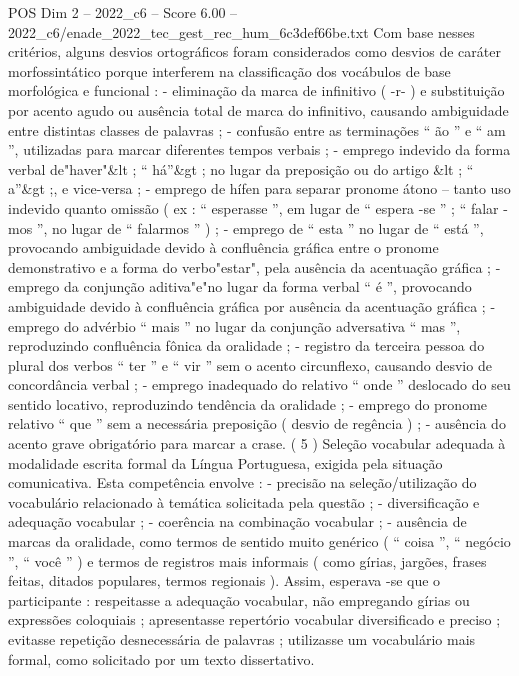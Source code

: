 \begin{textsample}{POS Dim 2 – 2022\_c6 – Score 6.00 – 2022\_c6/enade\_2022\_tec\_gest\_rec\_hum\_6c3def66be.txt}
Com base nesses critérios, alguns desvios ortográficos foram considerados como desvios de caráter morfossintático porque interferem na classificação dos vocábulos de base morfológica e funcional : - eliminação da marca de infinitivo ( -r- ) e substituição por acento agudo ou ausência total de marca do infinitivo, causando ambiguidade entre distintas classes de palavras ; - confusão entre as terminações “ ão ” e “ am ”, utilizadas para marcar diferentes tempos verbais ; - emprego indevido da forma verbal de"haver"\&lt ; “ há”\&gt ; no lugar da preposição ou do artigo \&lt ; “ a”\&gt ;, e vice-versa ; - emprego de hífen para separar pronome átono – tanto uso indevido quanto omissão ( ex : “ esperasse ”, em lugar de “ espera -se ” ; “ falar -mos ”, no lugar de “ falarmos ” ) ; - emprego de “ esta ” no lugar de “ está ”, provocando ambiguidade devido à confluência gráfica entre o pronome demonstrativo e a forma do verbo"estar", pela ausência da acentuação gráfica ; - emprego da conjunção aditiva"e"no lugar da forma verbal “ é ”, provocando ambiguidade devido à confluência gráfica por ausência da acentuação gráfica ; - emprego do advérbio “ mais ” no lugar da conjunção adversativa “ mas ”, reproduzindo confluência fônica da oralidade ; - registro da terceira pessoa do plural dos verbos “ ter ” e “ vir ” sem o acento circunflexo, causando desvio de concordância verbal ; - emprego inadequado do relativo “ onde ” deslocado do seu sentido locativo, reproduzindo tendência da oralidade ; - emprego do pronome relativo “ que ” sem a necessária preposição ( desvio de regência ) ; - ausência do acento grave obrigatório para marcar a crase. ( 5 ) Seleção vocabular adequada à modalidade escrita formal da Língua Portuguesa, exigida pela situação comunicativa.
Esta competência envolve : - precisão na seleção/utilização do vocabulário relacionado à temática solicitada pela questão ; - diversificação e adequação vocabular ; - coerência na combinação vocabular ; - ausência de marcas da oralidade, como termos de sentido muito genérico ( “ coisa ”, “ negócio ”, “ você ” ) e termos de registros mais informais ( como gírias, jargões, frases feitas, ditados populares, termos regionais ).
Assim, esperava -se que o participante : respeitasse a adequação vocabular, não empregando gírias ou expressões coloquiais ; apresentasse repertório vocabular diversificado e preciso ; evitasse repetição desnecessária de palavras ; utilizasse um vocabulário mais formal, como solicitado por um texto dissertativo.

\end{textsample}
